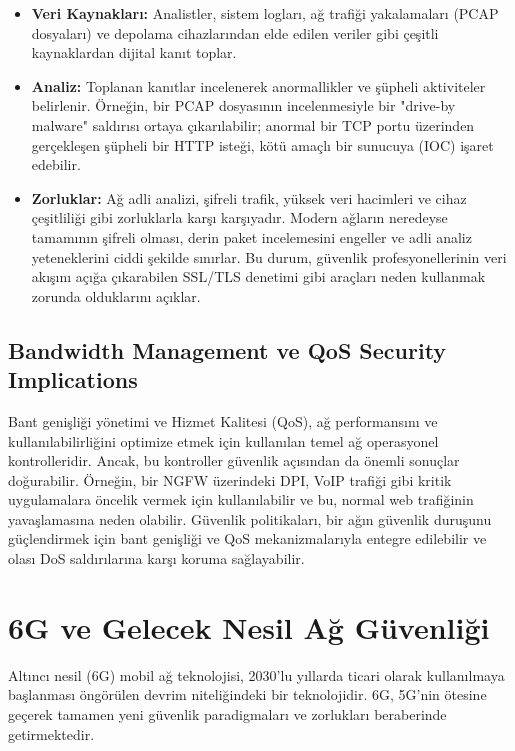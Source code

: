 \begin{itemize}
\item \textbf{Veri Kaynakları:} Analistler, sistem logları, ağ trafiği yakalamaları (PCAP dosyaları) ve depolama cihazlarından elde edilen veriler gibi çeşitli kaynaklardan dijital kanıt toplar.
\item \textbf{Analiz:} Toplanan kanıtlar incelenerek anormallikler ve şüpheli aktiviteler belirlenir. Örneğin, bir PCAP dosyasının incelenmesiyle bir "drive-by malware" saldırısı ortaya çıkarılabilir; anormal bir TCP portu üzerinden gerçekleşen şüpheli bir HTTP isteği, kötü amaçlı bir sunucuya (IOC) işaret edebilir.
\item \textbf{Zorluklar:} Ağ adli analizi, şifreli trafik, yüksek veri hacimleri ve cihaz çeşitliliği gibi zorluklarla karşı karşıyadır. Modern ağların neredeyse tamamının şifreli olması, derin paket incelemesini engeller ve adli analiz yeteneklerini ciddi şekilde sınırlar. Bu durum, güvenlik profesyonellerinin veri akışını açığa çıkarabilen SSL/TLS denetimi gibi araçları neden kullanmak zorunda olduklarını açıklar.
\end{itemize}

\subsection{Bandwidth Management ve QoS Security Implications}

Bant genişliği yönetimi ve Hizmet Kalitesi (QoS), ağ performansını ve kullanılabilirliğini optimize etmek için kullanılan temel ağ operasyonel kontrolleridir. Ancak, bu kontroller güvenlik açısından da önemli sonuçlar doğurabilir. Örneğin, bir NGFW üzerindeki DPI, VoIP trafiği gibi kritik uygulamalara öncelik vermek için kullanılabilir ve bu, normal web trafiğinin yavaşlamasına neden olabilir. Güvenlik politikaları, bir ağın güvenlik duruşunu güçlendirmek için bant genişliği ve QoS mekanizmalarıyla entegre edilebilir ve olası DoS saldırılarına karşı koruma sağlayabilir.

\section{6G ve Gelecek Nesil Ağ Güvenliği}

Altıncı nesil (6G) mobil ağ teknolojisi, 2030'lu yıllarda ticari olarak kullanılmaya başlanması öngörülen devrim niteliğindeki bir teknolojidir. 6G, 5G'nin ötesine geçerek tamamen yeni güvenlik paradigmaları ve zorlukları beraberinde getirmektedir.

